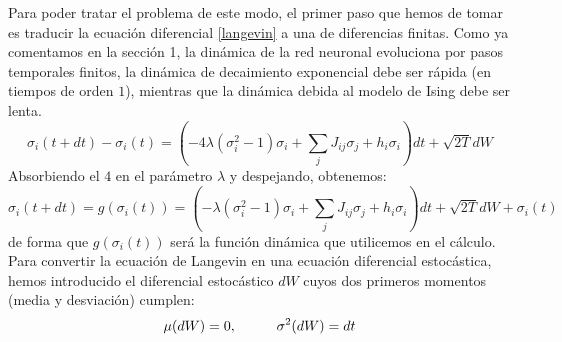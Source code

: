 \documentclass[titlepage,12pt]{article}
\numberwithin{equation}{section}
\begin{document}
	Para poder tratar el problema de este modo, el primer paso que hemos de tomar es traducir la ecuación diferencial \eqref{langevin} a una de diferencias finitas. Como ya comentamos en la sección 1, la dinámica de la red neuronal evoluciona por pasos temporales finitos, la dinámica de decaimiento exponencial debe ser rápida (en tiempos de orden $1$), mientras que la dinámica debida al modelo de Ising debe ser lenta.
	\begin{displaymath}
	\sigma_i(t+dt) - \sigma_i(t) = \left(  -4\lambda(\sigma_i^2 - 1)\sigma_i +  \sum_j J_{ij} \sigma_j + h_i\sigma_i \right) dt + \sqrt{2T}dW
	\end{displaymath}
	Absorbiendo el $4$ en el parámetro $\lambda$ y despejando, obtenemos:
	\begin{equation}
	\sigma_i(t+dt) = g(\sigma_i(t)) = \left(  -\lambda(\sigma_i^2 - 1)\sigma_i +  \sum_j J_{ij} \sigma_j + h_i\sigma_i \right) dt + \sqrt{2T}dW + \sigma_i(t)
	\label{dynfunc}
	\end{equation}
	de forma que $g (\sigma_i(t))$ será la función dinámica que utilicemos en el cálculo. Para convertir la ecuación de Langevin en una ecuación diferencial estocástica, hemos introducido el diferencial estocástico $dW$ cuyos dos primeros momentos (media y desviación) cumplen:
\begin{equation*}
\mu(dW) = 0, \hspace{10mm} \sigma^2(dW) = dt
\end{equation*}
\end{document}
